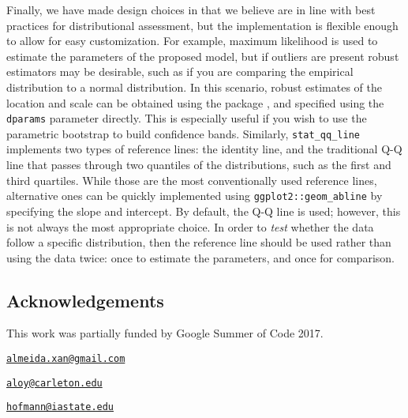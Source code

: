 Finally, we have made design choices in  that we believe
are in line with best practices for distributional assessment, but the
implementation is flexible enough to allow for easy customization. For
example, maximum likelihood is used to estimate the parameters of the
proposed model, but if outliers are present robust estimators may be
desirable, such as if you are comparing the empirical distribution to a
normal distribution. In this scenario, robust estimates of the location
and scale can be obtained using the  package
\citep{robustbase}, and specified using the \texttt{dparams} parameter
directly. This is especially useful if you wish to use the parametric
bootstrap to build confidence bands. Similarly, \texttt{stat\_qq\_line}
implements two types of reference lines: the identity line, and the
traditional Q-Q line that passes through two quantiles of the
distributions, such as the first and third quartiles. While those are
the most conventionally used reference lines, alternative ones can be
quickly implemented using \texttt{ggplot2::geom\_abline} by specifying
the slope and intercept. By default, the Q-Q line is used; however, this
is not always the most appropriate choice. In order to \emph{test}
whether the data follow a specific distribution, then the reference line
should be used rather than using the data twice: once to estimate the
parameters, and once for comparison.



\subsection{Acknowledgements}\label{acknowledgements}

This work was partially funded by Google Summer of Code 2017.

\address{%
Alexandre Almeida\\
University of Campinas\\
Institute of Computing\\ Campinas, Brazil 13083-852\\
}
\href{mailto:almeida.xan@gmail.com}{\nolinkurl{almeida.xan@gmail.com}}

\address{%
Adam Loy\\
Carleton College\\
Department of Mathematics and Statistics\\ Northfield, MN 55057\\
}
\href{mailto:aloy@carleton.edu}{\nolinkurl{aloy@carleton.edu}}

\address{%
Heike Hofmann\\
Iowa State University\\
Department of Statistics\\ Ames, IA 50011-1210\\
}
\href{mailto:hofmann@iastate.edu}{\nolinkurl{hofmann@iastate.edu}}

